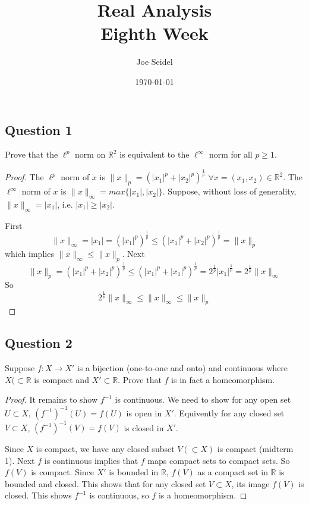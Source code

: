 \documentclass{tufte-book}
\title{Real Analysis\\Eighth Week }
\author{Joe Seidel}
\date{\today}
\theoremstyle{mytheoremstyle}
\theoremstyle{mylemstyle}
\theoremstyle{mydefstyle}
\begin{document}
\maketitle
{}
\newpage
{}

\subsection{Question 1}
Prove that the $\ell^p$ norm on $\mathbb{R}^2$ is equivalent to the $\ell^\infty$ norm for all $p \geq 1$.

\begin{proof}
The $\ell^p$ norm of $x$ is $\|x\|_p = (|x_1|^p + |x_2|^p)^{\frac{1}{p}}$ $\forall x = (x_1,x_2) \in \mathbb{R}^2$.  The $\ell^\infty$ norm of $x$ is $\|x\|_\infty = max\{|x_1|, |x_2|\}$.  Suppose, without loss of generality, $\|x\|_\infty = |x_1|$, i.e. $|x_1| \geq |x_2|$.

First 
\[ \|x\|_\infty = |x_1| = (|x_1|^p)^\frac{1}{p} \leq (|x_1|^p + |x_2|^p)^\frac{1}{p} = \|x\|_p \]
which implies $\|x\|_\infty \leq \|x\|_p$.
Next
\[ \|x\|_p = (|x_1|^p + |x_2|^p)^{\frac{1}{p}} \leq (|x_1|^p + |x_1|^p)^\frac{1}{p} = 2^\frac{1}{p}|x_1|^\frac{1}{p} = 2^\frac{1}{p}\|x\|_\infty \]
So
\[  2^\frac{1}{p}\|x\|_\infty \leq \|x\|_\infty \leq \|x\|_p \]

\end{proof}

\subsection{Question 2}
Suppose $f: X \to X'$ is a bijection (one-to-one and onto) and continuous where $X(\subset \mathbb{R}$ is compact and $X' \subset \mathbb{R}$.  Prove that $f$ is in fact a homeomorphism.

\begin{proof}
It remains to show $f^{-1}$ is continuous.  We need to show for any open set $U \subset X$, $(f^{-1})^{-1}(U) = f(U)$ is open in $X'$.  Equivently for any closed set $V \subset X$, $(f^{-1})^{-1}(V) = f(V)$  is closed in $X'$.

Since $X$ is compact, we have any closed subset $V(\subset X)$ is compact (midterm 1).  Next $f$ is continuous implies that $f$ maps compact sets to compact sets. So $f(V)$ is compact.  Since $X'$ is bounded in $\mathbb{R}$, $f(V)$ as a compact set in $\mathbb{R}$ is bounded and closed.  This shows that for any closed set $V \subset X$, its image $f(V)$ is closed.  This shows $f^{-1}$ is continuous, so $f$ is a homeomorphism.
\end{proof}
\end{document}

